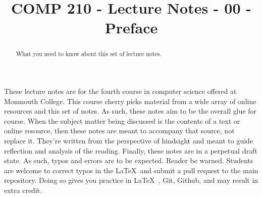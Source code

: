 \documentclass[]{tufte-handout}
\title{COMP 210 - Lecture Notes - 00 -Preface}
\begin{document}
\maketitle

\begin{abstract}
What you need to know about this set of lecture notes.
\end{abstract}

These lecture notes are for the fourth course in computer science offered at Monmouth College.  This course cherry picks material from a wide array of online resources and this set of notes.  As such, these notes aim to be the overall glue for course.  When the subject matter being discussed is the contents of a text or online resource, then these notes are meant to accompany that source, not replace it.  They're written from the perspective of hindsight and meant to guide reflection and analysis of the reading. 
Finally, these notes are in a perpetual draft state. As such, typos and errors are to be expected. Reader be warned. Students are welcome to correct typos in the \LaTeX\ and submit a pull request to the main repository. Doing so gives you practice in \LaTeX\ , Git, Github, and may result in extra credit.
\end{document}
